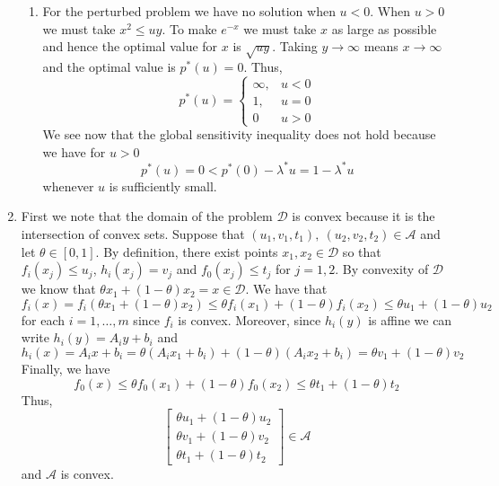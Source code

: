 \documentclass[11pt]{amsart}
\begin{document}
\begin{enumerate}
\begin{enumerate}
\item For the perturbed problem we have no solution when $u < 0$.  When $u > 0$ we must take $x^2 \le uy$.  To make $e^{-x}$ we must take $x$ as large as possible and hence the optimal value for $x$ is $\sqrt{uy}$.  Taking $y \to \infty$ means $x\to \infty$ and the optimal value is $p^*(u) = 0$.  Thus,
\[
p^*(u) = \begin{cases}
\infty, & u < 0\\
1, & u = 0\\
0 & u > 0
\end{cases}
\]
We see now that the global sensitivity inequality does not hold because we have for $u > 0$
\[
p^*(u) = 0 < p^*(0) - \lambda^*u = 1 -\lambda^* u
\]
whenever $u$ is sufficiently small.
\end{enumerate}






\vspace{0.5in}



\item First we note that the domain of the problem $\mathcal{D}$ is convex because it is the intersection of convex sets.  Suppose that $(u_1,v_1,t_1),\ (u_2,v_2,t_2) \in \mathcal{A}$ and let $\theta \in [0,1]$.  By definition, there exist points $x_1,x_2 \in \mathcal{D}$ so that $f_i(x_j) \le u_j$, $h_i(x_j) = v_j$ and $f_0(x_j) \le t_j$ for $j=1,2$.  By convexity of $\mathcal{D}$ we know that $\theta x_1 + (1-\theta)x_2 = x \in \mathcal{D}$.  We have that
\[
f_i(x) = f_i(\theta x_1 + (1-\theta)x_2) \le \theta f_i(x_1) + (1-\theta)f_i(x_2) \le \theta u_1 + (1-\theta)u_2
\]
for each $i=1,\ldots,m$ since $f_i$ is convex.  Moreover, since $h_i(y)$ is affine we can write $h_i(y) = A_iy + b_i$ and
\[
h_i(x) = A_ix + b_i = \theta (A_i x_1 + b_i) + (1-\theta)(A_i x_2 + b_i) = \theta v_1 + (1-\theta)v_2
\]
Finally, we have 
\[
f_0(x) \le \theta f_0(x_1) + (1-\theta)f_0(x_2) \le \theta t_1 + (1-\theta)t_2
\]
Thus, 
\[
 \begin{bmatrix}
\theta u_1 + (1-\theta)u_2\\
\theta v_1 + (1-\theta)v_2\\
\theta t_1 + (1-\theta)t_2
\end{bmatrix} \in \mathcal{A}
\]
and $\mathcal{A}$ is convex.


\vspace{0.5in}




\end{enumerate}
\end{document}
